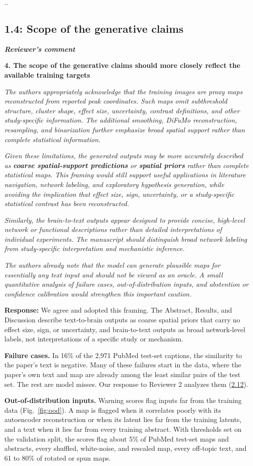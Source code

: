 \documentclass[11pt]{article}
\newcommand{\revqopen}{\begin{lrbox}{\revbox}\begin{minipage}{\dimexpr\linewidth-2\fboxsep\relax}%
  \setlength{\parskip}{0.45em}\small\itshape\color{black!85}}
\newcommand{\revqclose}{\end{minipage}\end{lrbox}\colorbox{quotebg}{\usebox{\revbox}}}
\newcommand{\revqpar}{\revqclose\par\nointerlineskip\noindent\revqopen}
\newenvironment{revquote}{\par\smallskip\setlength{\parskip}{0pt}\noindent\revqopen
  {\small\upshape\bfseries\color{black!70}Reviewer's comment}\par}%
  {\revqclose\par\medskip}
\newcommand{\response}{\textbf{Response:} }
\newcommand{\cmt}[1]{\hyperref[sec:#1]{#1}}
\newcommand{\revcomment}[2]{\FloatBarrier\phantomsection\revzero#1..\relax{\label{sec:#1}}%
  {\addcontentsline{toc}{subsection}{#1: #2}\subsection*{#1: #2}\label{sec:#1}}}
\begin{document}
\revcomment{1.4}{Scope of the generative claims}\begin{revquote}
\textbf{4. The scope of the generative claims should more closely reflect the available training targets}
\revqpar The authors appropriately acknowledge that the training images are proxy maps reconstructed from reported peak coordinates. Such maps omit subthreshold structure, cluster shape, effect size, uncertainty, contrast definitions, and other study-specific information. The additional smoothing, DiFuMo reconstruction, resampling, and binarization further emphasize broad spatial support rather than complete statistical information.
\revqpar Given these limitations, the generated outputs may be more accurately described as \textbf{coarse spatial-support predictions} or \textbf{spatial priors} rather than complete statistical maps. This framing would still support useful applications in literature navigation, network labeling, and exploratory hypothesis generation, while avoiding the implication that effect size, sign, uncertainty, or a study-specific statistical contrast has been reconstructed.
\revqpar Similarly, the brain-to-text outputs appear designed to provide concise, high-level network or functional descriptions rather than detailed interpretations of individual experiments. The manuscript should distinguish broad network labeling from study-specific interpretation and mechanistic inference.
\revqpar The authors already note that the model can generate plausible maps for essentially any text input and should not be viewed as an oracle. A small quantitative analysis of failure cases, out-of-distribution inputs, and abstention or confidence calibration would strengthen this important caution.
\end{revquote}\response We agree and adopted this framing. The Abstract, Results, and Discussion describe text-to-brain outputs as coarse spatial priors that carry no effect size, sign, or uncertainty, and brain-to-text outputs as broad network-level labels, not interpretations of a specific study or mechanism.

\textbf{Failure cases.} In 16\% of the 2,971 PubMed test-set captions, the similarity to the paper's text is negative. Many of these failures start in the data, where the paper's own text and map are already among the least similar pairs of the test set. The rest are model misses. Our response to Reviewer 2 analyzes them (\cmt{2.12}).

\textbf{Out-of-distribution inputs.} Warning scores flag inputs far from the training data (Fig.~\ref{fig:ood}). A map is flagged when it correlates poorly with its autoencoder reconstruction or when its latent lies far from the training latents, and a text when it lies far from every training abstract. With thresholds set on the validation split, the scores flag about 5\% of PubMed test-set maps and abstracts, every shuffled, white-noise, and rescaled map, every off-topic text, and 61 to 80\% of rotated or spun maps.
\end{document}
